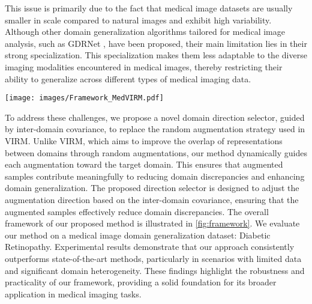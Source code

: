 This issue is primarily due to the fact that medical image datasets are usually smaller in scale compared to natural images and exhibit high variability.
Although other domain generalization algorithms tailored for medical image analysis, such as GDRNet \cite{dgdr2023}, have been proposed, their main limitation lies in their strong specialization.
This specialization makes them less adaptable to the diverse imaging modalities encountered in medical images, thereby restricting their ability to generalize across different types of medical imaging data.

\begin{figure*}
    \centering
    \texttt{[image: images/Framework\_MedVIRM.pdf]}
    \caption{Overview of the proposed method framework.
    Our method includes an inter-domain covariance-guided direction selector and a distribution estimator that enhances the range of distribution.
        $\mathbf{x}^i$ denotes the input image from domain $i$, $\mathbf{z}^i$ denotes the feature representation of $\mathbf{x}^i$, 
        $\mathbf{d}^i_j$ denotes the augment direction for domain $i$ to domian $j$, 
        and $\tilde{z}^i_j$ denotes the augmented feature representation of $\mathbf{z}^i$ in domain $j$.
    }
    \label{fig:framework}
\end{figure*}


To address these challenges, we propose a novel domain direction selector, guided by inter-domain covariance, to replace the random augmentation strategy used in VIRM.
Unlike VIRM, which aims to improve the overlap of representations between domains through random augmentations, our method dynamically guides each augmentation toward the target domain.
This ensures that augmented samples contribute meaningfully to reducing domain discrepancies and enhancing domain generalization.
The proposed direction selector is designed to adjust the augmentation direction based on the inter-domain covariance, ensuring that the augmented samples effectively reduce domain discrepancies.
The overall framework of our proposed method is illustrated in \cref{fig:framework}.
We evaluate our method on a medical image domain generalization dataset: Diabetic Retinopathy.
Experimental results demonstrate that our approach consistently outperforms state-of-the-art methods, particularly in scenarios with limited data and significant domain heterogeneity.
These findings highlight the robustness and practicality of our framework, providing a solid foundation for its broader application in medical imaging tasks.

